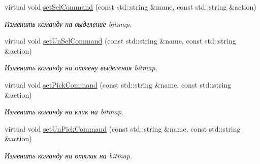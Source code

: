 \begin{DoxyCompactItemize}
virtual void \hyperlink{class_interface_element_class_a0e55bb0f0037715b19c29ce05a57abdc}{set\+Sel\+Command} (const std\+::string \&name, const std\+::string \&action)
\begin{DoxyCompactList}\small\item\em Изменить команду на выделение bitmap. \end{DoxyCompactList}\item 
virtual void \hyperlink{class_interface_element_class_ac327534caba198bf3347e1513cfe8491}{set\+Un\+Sel\+Command} (const std\+::string \&name, const std\+::string \&action)
\begin{DoxyCompactList}\small\item\em Изменить команду на отмену выделения bitmap. \end{DoxyCompactList}\item 
virtual void \hyperlink{class_interface_element_class_a866babb9cc309763567529771467fb76}{set\+Pick\+Command} (const std\+::string \&name, const std\+::string \&action)
\begin{DoxyCompactList}\small\item\em Изменить команду на клик на bitmap. \end{DoxyCompactList}\item 
virtual void \hyperlink{class_interface_element_class_a3823d61803f374b60458c9e8a7ff1505}{set\+Un\+Pick\+Command} (const std\+::string \&name, const std\+::string \&action)
\begin{DoxyCompactList}\small\item\em Изменить команду на отклик на bitmap. \end{DoxyCompactList}\end{DoxyCompactItemize}
